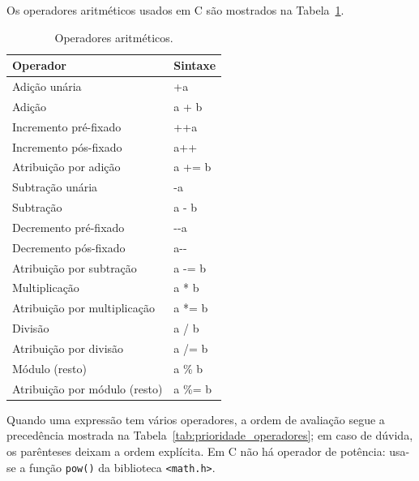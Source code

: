 \documentclass[11pt,fleqn]{book} %
\begin{document}
Os operadores aritméticos usados em C são mostrados na Tabela~\ref{tab:opareadores_aritmeticos}.
\begin{table}[htbp]
	\centering
	\caption{Operadores aritméticos.}
	\label{tab:opareadores_aritmeticos}
		\begin{tabular}{@{}ll@{}}
			\toprule
			\textbf{Operador}             & \textbf{Sintaxe} \\ \midrule
			Adição unária                 & +a               \\
			Adição                        & a + b            \\
			Incremento pré-fixado         & ++a              \\
			Incremento pós-fixado         & a++              \\
			Atribuição por adição         & a += b           \\
			Subtração unária              & -a               \\
			Subtração                     & a - b            \\
			Decremento pré-fixado         & -{}-a            \\
			Decremento pós-fixado         & a-{}-            \\
			Atribuição por subtração      & a -= b           \\
			Multiplicação                 & a * b            \\
			Atribuição por multiplicação  & a *= b           \\
			Divisão                       & a / b            \\
			Atribuição por divisão        & a /= b           \\
			Módulo (resto)                & a \% b           \\
			Atribuição por módulo (resto) & a \%= b          \\ \bottomrule
		\end{tabular}%
\end{table}
Quando uma expressão tem vários operadores, a ordem de avaliação segue a precedência mostrada na Tabela~\ref{tab:prioridade_operadores}; em caso de dúvida, os parênteses deixam a ordem explícita.
Em C não há operador de potência: usa-se a função \texttt{pow()} da biblioteca \texttt{<math.h>}.
\end{document}
